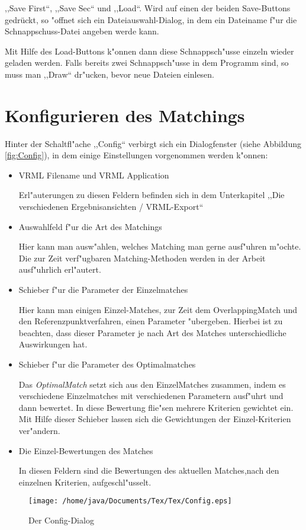 ,,Save First``, ,,Save Sec`` und ,,Load``. Wird auf einen der beiden Save-Buttons gedrückt, so "offnet sich ein Dateiauswahl-Dialog, in dem ein Dateiname f"ur die Schnappschuss-Datei angeben werde kann.

Mit Hilfe des Load-Buttons k"onnen dann diese Schnappsch"usse einzeln wieder geladen werden. Falls bereits zwei Schnappsch"usse in dem Programm sind, so muss man ,,Draw`` dr"ucken, bevor neue Dateien einlesen.
\section{Konfigurieren des Matchings}
Hinter der Schaltfl"ache ,,Config`` verbirgt sich ein Dialogfenster (siehe Abbildung \vref{fig:Config}), in dem einige Einstellungen vorgenommen werden k"onnen:

\begin{itemize}
\item VRML Filename und VRML Application

Erl"auterungen zu diesen Feldern befinden sich in dem Unterkapitel ,,Die verschiedenen Ergebnisansichten / VRML-Export``

\item Auswahlfeld f"ur die Art des Matchings

Hier kann man ausw"ahlen, welches Matching man gerne ausf"uhren m"ochte. Die zur Zeit verf"ugbaren Matching-Methoden werden in der Arbeit ausf"uhrlich erl"autert.

\item Schieber f"ur die Parameter der Einzelmatches

Hier kann man einigen Einzel-Matches, zur Zeit dem OverlappingMatch und den Referenzpunktverfahren, einen Parameter "ubergeben. Hierbei ist zu beachten, dass dieser Parameter je nach Art des Matches unterschiedliche Auswirkungen hat.

\item Schieber f"ur die Parameter des Optimalmatches

Das \textit{OptimalMatch} setzt sich aus den EinzelMatches zusammen, indem es verschiedene Einzelmatches mit verschiedenen Parametern ausf"uhrt und dann bewertet. In diese Bewertung flie"sen mehrere Kriterien gewichtet ein. Mit Hilfe dieser Schieber lassen sich die Gewichtungen der Einzel-Kriterien ver"andern.

\item Die Einzel-Bewertungen des Matches

In diesen Feldern sind die Bewertungen des aktuellen Matches,nach den einzelnen Kriterien, aufgeschl"usselt.
\end{itemize} 
\begin{figure}
   \centering
   \texttt{[image: /home/java/Documents/Tex/Tex/Config.eps]}
   \caption{Der Config-Dialog}
   \label{fig:Config}
\end{figure}
